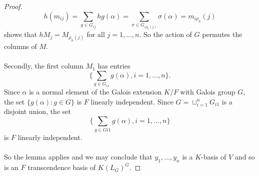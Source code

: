 \documentclass[12pt]{article}
\theoremstyle{plain}
\begin{document}
\begin{proof}
$$h(m_{ij}) = \sum_{g \in G_{ij}}hg(\alpha) = \sum_{\sigma \in G_{i \rho_{h}(j)}}\sigma (\alpha) = m_{i \rho_{h}}(j)$$
shows that $hM_j = M_{\rho_h(j)}$ for all $j = 1, \ldots, n$. So the action of $G$ permutes the columns of $M$. \\
\\
Secondly, the first column $M_1$ has entries 
$$\lbrace\sum_{g \in G_{i1}}g(\alpha), i = 1, \ldots,n\rbrace.$$
Since $\alpha$ is a normal element of the Galois extension $K/F$ with Galois group $G$, the set $\lbrace g(\alpha): g \in G \rbrace$ is $F$ linearly independent. Since $G = \sqcup^n_{i =1}G_{i1}$ is a disjoint union, the set 
$$\lbrace \sum_{g \in G{i1}}g(\alpha), i = 1, \ldots, n \rbrace$$
is $F$ linearly independent.\\
\\
So the lemma applies and we may conclude that $y_1, \ldots, y_n$ is a $K$-basis of $V$ and so is an $F$ transcendence basis of $K(L_G)^G$.

\end{proof}
\end{document}
